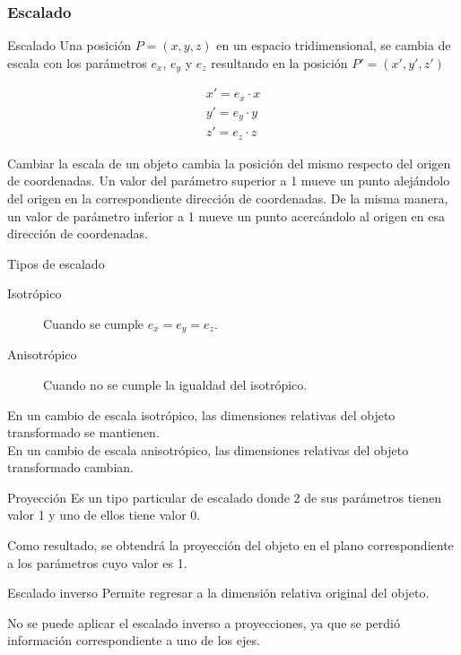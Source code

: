 \documentclass[a4paper, twoside]{article}
\begin{document}
\subsubsection{Escalado}
\begin{definicion*}{Escalado}
	Una posición $P = (x, y, z)$ en un espacio tridimensional, se cambia de escala con los parámetros $e_x$, $e_y$ y $e_z$ resultando en la posición $P' = (x', y', z')$

	\begin{align*}
		x' = e_x \cdot x \\
		y' = e_y \cdot y \\
		z' = e_z \cdot z
	\end{align*}

	Cambiar la escala de un objeto cambia la posición del mismo respecto del origen de coordenadas. Un valor del parámetro superior a 1 mueve un punto alejándolo del origen en la correspondiente dirección de coordenadas.
De la misma manera, un valor de parámetro inferior a 1 mueve un punto acercándolo al origen en esa dirección de coordenadas.
\end{definicion*}

\begin{definicion*}{Tipos de escalado}
	\begin{description}
		\item[Isotrópico] Cuando se cumple $ e_x = e_y = e_z $.
		\item[Anisotrópico] Cuando no se cumple la igualdad del isotrópico.
	\end{description}

	En un cambio de escala isotrópico, las dimensiones relativas del objeto transformado se mantienen.\\
	En un cambio de escala anisotrópico, las dimensiones relativas del objeto transformado cambian.
\end{definicion*}

\begin{definicion*}{Proyección}
	Es un tipo particular de escalado donde 2 de sus parámetros tienen valor 1 y uno de ellos tiene valor 0.

	Como resultado, se obtendrá la proyección del objeto en el plano correspondiente a los parámetros cuyo valor es 1.
\end{definicion*}

\begin{definicion*}{Escalado inverso}
	Permite regresar a la dimensión relativa original del objeto.

	No se puede aplicar el escalado inverso a proyecciones, ya que se perdió información correspondiente a uno de los ejes.
\end{definicion*}
\end{document}
